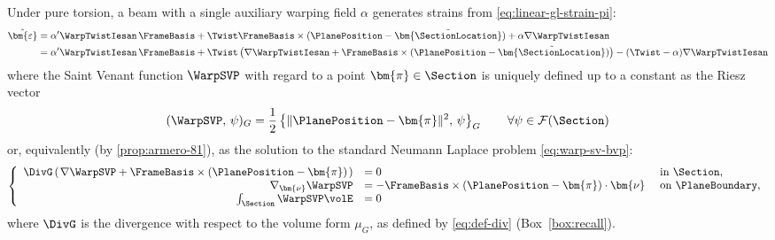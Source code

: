 Under pure torsion, a beam with a single auxiliary warping field \(\alpha\) generates strains from \eqref{eq:linear-gl-strain-pi}:
\begin{equation}
\begin{aligned}
\hat{\bm{\varepsilon}} 
&= \alpha' \WarpTwistIesan\,\FrameBasis + \Twist \FrameBasis \times (\PlanePosition-\tilde{\bm{\SectionLocation}}) + \alpha \nabla  \WarpTwistIesan \\
&= \alpha' \WarpTwistIesan\,\FrameBasis +  \Twist \, \bigl(\nabla \WarpTwistIesan + \FrameBasis\times(\PlanePosition - \tilde{\bm{\SectionLocation}})\bigr) - (\Twist - \alpha) \nabla \WarpTwistIesan
\end{aligned}
\label{eq:torsion-strain}
\end{equation}
where the Saint Venant function \(\WarpSVP\) with regard to a point \(\bm{\pi} \in \Section\) is uniquely defined up to a constant as the Riesz vector 
\begin{equation}
    (\WarpSVP,\, \psi)_G =  \frac{1}{2} \left\{ \| \PlanePosition - \bm{\pi}\|^2,\, \psi\right\}_G %
    \qquad \forall \psi \in \mathcal{F}(\Section)
    \label{eq:def-sv-riesz}
\end{equation}
or, equivalently (by \cref{prop:armero-81}), as the solution to the standard Neumann Laplace problem \eqref{eq:warp-sv-bvp}:
\begin{equation}
\left\{
\begin{array}{rll}
\DivG\left(\left.\nabla \WarpSVP+\FrameBasis \times(\PlanePosition-\bm{\pi})\right.\right) &=0 & \text { in } \Section, \\
\nabla_{\bm{\nu}} \WarpSVP &=-\FrameBasis\times(\PlanePosition-{\bm{\pi}}) \cdot \bm{\nu} & \text { on } \PlaneBoundary, \\
\int_{\Section} \WarpSVP \volE &= 0
\end{array}
\right.
\end{equation}
where \(\DivG\) is the divergence with respect to the volume form \(\mu_G\), as defined by \eqref{eq:def-div} (Box~\ref{box:recall}). 



